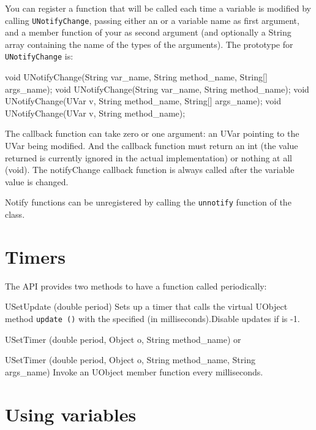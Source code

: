 You can register a function that will be called each time a variable is
modified by calling \lstinline{UNotifyChange}, passing either an \UVar or a
variable name as first argument, and a member function of your \UObject as
second argument (and optionally a String array containing the name of the
types of the arguments). The prototype for \lstinline{UNotifyChange} is:

\begin{java}
void UNotifyChange(String var_name, String method_name, String[] args_name);
void UNotifyChange(String var_name, String method_name);
void UNotifyChange(UVar v, String method_name, String[] args_name);
void UNotifyChange(UVar v, String method_name);
\end{java}

The callback function can take zero or one argument: an UVar pointing to the
UVar being modified. And the callback function must return an int (the value
returned is currently ignored in the actual implementation) or nothing at
all (void).  The notifyChange callback function is always called after the
variable value is changed.

Notify functions can be unregistered by calling the \lstinline{unnotify}
function of the \UVar class.

\section{Timers}
\label{sec:uob:apijava:timers}
The API provides two methods to have a function called periodically:
\begin{cxxapi}
\item[USetUpdate (double period)] Sets up a timer that calls the virtual
  UObject method \lstinline{update ()} with the specified  (in
  milliseconds).Disable updates if  is -1.
\item[USetTimer (double period, Object o, String method\_name)] or
\item[USetTimer (double period, Object o, String method\_name, String\[\]
  args\_name)] Invoke an UObject member function  every
   milliseconds.
\end{cxxapi}


\section{Using \urbi variables}
\label{sec:uob:apijava:uvar}

